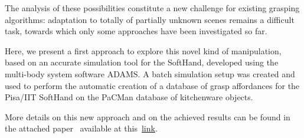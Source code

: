 The analysis of these possibilities constitute a new challenge for existing grasping algorithms: adaptation to totally of partially unknown scenes remains a difficult task, towards which only some approaches have been investigated so far.

Here, we present a first approach to explore this novel kind of manipulation, based on an accurate simulation tool for the SoftHand, developed using the multi-body system software ADAMS. A batch simulation setup was created and used to perform the automatic creation of a database of grasp affordances for the Pisa/IIT SoftHand on the PaCMan database of kitchenware objects.

More details on this new approach and on the achieved results can be found in the attached paper~\cite{Bonilla:Humanoids:2015} available at this~\href{./attachedPapers/GraspingWithSoftHands.pdf}{link}. 